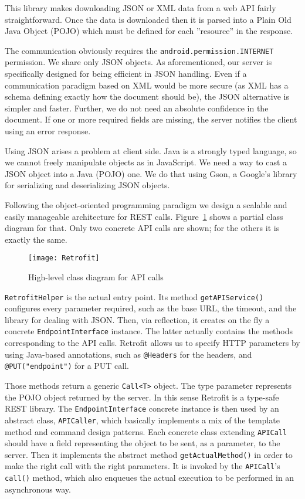 This library makes downloading JSON or XML data from a web API fairly 
straightforward. Once the data is downloaded then it is parsed into a 
Plain Old Java Object (POJO) which must be defined for each ''resource'' 
in the response.

The communication obviously requires the \texttt{android.permission.INTERNET}
permission. We share only JSON objects. As aforementioned, our server is 
specifically designed for being efficient in JSON handling. Even if a 
communication paradigm based on XML would be more secure (as XML has a schema
defining exactly how the document should be), the JSON alternative is simpler 
and faster. Further, we do not need an absolute confidence in the document. If
one or more required fields are missing, the server notifies the client using an
error response.

Using JSON arises a problem at client side. Java is a strongly typed language, so we
cannot freely manipulate objects as in JavaScript. We need a way to cast a JSON 
object into a Java (POJO) one. We do that using Gson, a Google's library for 
serializing and deserializing JSON objects. 

Following the object-oriented programming paradigm we design a scalable and easily 
manageable architecture for REST calls. Figure~\ref{fig:retrofit} shows a partial
class diagram for that. Only two concrete API calls are shown; for the others it 
is exactly the same.
\begin{figure}[h]
	\centering
	\texttt{[image: Retrofit]}
	\caption{High-level class diagram for API calls}
	\label{fig:retrofit}
\end{figure}

\texttt{RetrofitHelper} is the actual entry point. Its method \texttt{getAPIService()}
configures every parameter required, such as the base URL, the timeout, and the 
library for dealing with JSON. Then, via reflection, it creates on the fly a 
concrete \texttt{EndpointInterface} instance. The latter actually contains the
methods corresponding to the API calls. Retrofit allows us to specify HTTP
parameters by using Java-based annotations, such as \texttt{@Headers} for the
headers, and \texttt{@PUT("endpoint")} for a PUT call. 

Those methods return a generic \texttt{Call<T>} object. The type parameter 
represents the POJO object returned by the server. In this sense Retrofit is a
type-safe REST library. The \texttt{EndpointInterface} concrete instance is then
used by an abstract class, \texttt{APICaller}, which basically implements a mix
of the template method and command design patterns. Each concrete class extending
\texttt{APICall} should have a field representing the object to be sent, 
as a parameter, to the server. Then it implements the abstract method 
\texttt{getActualMethod()} in order to make the right call with the right 
parameters. It is invoked by the \texttt{APICall}'s \texttt{call()} method,
which also enqueues the actual execution to be performed in an asynchronous way. 

